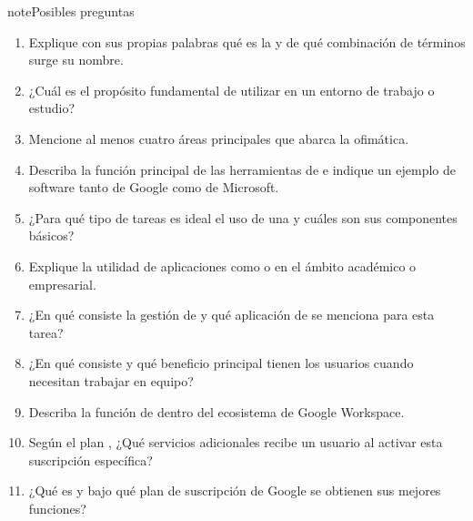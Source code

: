 \documentclass[letterpaper,10pt,spanish]{sphinxmanual}
\begin{document}
\begin{sphinxadmonition}{note}{Posibles preguntas}
\begin{enumerate}
%
\item {} 
\sphinxAtStartPar
Explique con sus propias palabras qué es la  y de qué combinación de términos surge su nombre.

\item {} 
\sphinxAtStartPar
¿Cuál es el propósito fundamental de utilizar  en un entorno de trabajo o estudio?

\item {} 
\sphinxAtStartPar
Mencione al menos cuatro áreas principales que abarca la ofimática.

\item {} 
\sphinxAtStartPar
Describa la función principal de las herramientas de  e indique un ejemplo de software tanto de Google como de Microsoft.

\item {} 
\sphinxAtStartPar
¿Para qué tipo de tareas es ideal el uso de una  y cuáles son sus componentes básicos?

\item {} 
\sphinxAtStartPar
Explique la utilidad de aplicaciones como  o  en el ámbito académico o empresarial.

\item {} 
\sphinxAtStartPar
¿En qué consiste la gestión de  y qué aplicación de  se menciona para esta tarea?

\item {} 
\sphinxAtStartPar
¿En qué consiste  y qué beneficio principal tienen los usuarios cuando necesitan trabajar en equipo?

\item {} 
\sphinxAtStartPar
Describa la función de  dentro del ecosistema de Google Workspace.

\item {} 
\sphinxAtStartPar
Según el plan , ¿Qué servicios adicionales recibe un usuario al activar esta suscripción específica?

\item {} 
\sphinxAtStartPar
¿Qué es  y bajo qué plan de suscripción de Google se obtienen sus mejores funciones?


\end{enumerate}
\end{sphinxadmonition}
\end{document}
